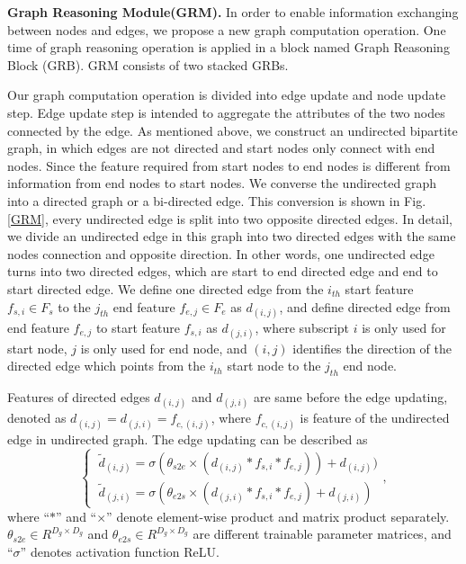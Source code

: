 \documentclass[runningheads]{llncs}
\begin{document}
\noindent\textbf{Graph Reasoning Module(GRM).}
In order to enable information exchanging between nodes and edges, we propose a new graph computation operation. One time of graph reasoning operation is applied in a block named Graph Reasoning Block (GRB). GRM consists of two stacked GRBs.

Our graph computation operation is divided into edge update and node update step. Edge update step is intended to aggregate the attributes of the two nodes connected by the edge. As mentioned above, we construct an undirected bipartite graph, in which edges are not directed and start nodes only connect with end nodes. Since the feature required from start nodes to end nodes is different from information from end nodes to start nodes. We converse the undirected graph into a directed graph or a bi-directed edge. This conversion is shown in Fig.\ref{GRM}, every undirected edge is split into two opposite directed edges. In detail, we divide an undirected edge in this graph into two directed edges with the same nodes connection and opposite direction. In other words, one undirected edge turns into two directed edges, which are start to end directed edge and end to start directed edge. We define one directed edge from the $i_{th}$ start feature $f_{s,i} \in F_s$  to the $j_{th}$ end feature $f_{e,j} \in F_e$ as $d_{(i, j)}$, and define directed edge from end feature $f_{e,j}$ to start feature $f_{s,i}$ as $d_{ (j,i)}$, where subscript $i$ is only used for start node, $j$ is only used for end node, and $(i,j)$ identifies the direction of the directed edge which points from the $i_{th}$ start node to the $j_{th}$ end node.

Features of directed edges $d_{(i,j)}$ and $d_{(j,i)}$ are same before the edge updating, denoted as $d_{(i,j)}=d_{(j, i)}=f_{c,(i,j)} $, where $f_{c,(i,j)}$ is feature of the undirected edge in undirected graph. The edge updating can be described as
\begin{equation}
\begin{cases}
 \ \tilde d_ {(i, j)} = \sigma (\theta_{s2e} \times (d_{(i, j)} * f_{s, i} *f_{e, j})) + d_{(i, j)})
 \\
 \ \tilde d_{(j, i)} = \sigma (\theta_{e2s} \times (d_{(j, i)} * f_{s, i} *f_{{e, j}}) + d_{(j, i)})
\end{cases},
\end{equation}
where ``$*$'' and ``$\times$'' denote element-wise product and matrix product separately. $\theta_{s2e} \in R^{D_g \times D_g}$ and $\theta_{e2s} \in R^{D_g \times D_g}$ are different trainable parameter matrices, and ``$\sigma$'' denotes activation function ReLU.
\end{document}
